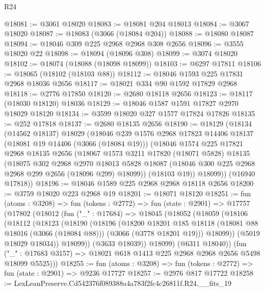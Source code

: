 \begin{lexlean}{R24}
\begin{coremodule}
@18081 := @3061 @18020
@18083 := @18081 @204 @18013
@18084 := @3067 @18020
@18087 := @18083 (@3066 (@18084 @204))
@18088 := @18080 @18087
@18094 := @18046 @309 @225 @2968 @2968 @308 @2656
@18096 := @3555 @18020 @22
@18098 := @18094 (@18096 @308)
@18099 := @3074 @18020
@18102 := @18074 (@18088 (@18098 @18099))
@18103 := @6297 @17811
@18106 := @18065 (@18102 (@18103 @88))
@18112 := @18046 @1593 @225 @17831 @2968 @18036 @2656
@18117 := @18021 @334 @90 @1592 @17829 @2968
@18118 := @2776 @17850
@18120 := @2680 @18118 @2656
@18123 := @18117 (@18030 @18120) @18036
@18129 := @18046 @1587 @1591 @17827 @2970 @18029 @18120
@18134 := @3599 @18020 @327 @1577 @17824 @17826
@18135 := @252 @17818
@18137 := @2680 @18135 @2656
@18190 := @18129
    (@18134
      (@14562 @18137)
      @18029
      (@18046
        @239
        @1576
        @2968
        @17823
        @14406
        @18137
        (@18081 @19 @14406 (@3066 (@18084 @19)))
        (@18046
          @1574
          @225
          @17821
          @2968
          @18135
          @2656
          (@18067
            @1573
            @3211
            @17820
            (@18071 @5828)
            @18135
            (@18075
              @302
              @2968
              @2970
              @18013
              @5828
              @18087
              (@18046 @300 @225 @2968 @2968 @299 @2656 (@18096 @299) @18099))
            (@18103 @19))
          @18099))
      (@16940 @17818))
@18196 := @18046 @1589 @225 @2968 @2968 @18118 @2656
@18200 := @3759 @18020 @223 @2968 @19
@18201 := @18071 @18120
@18251 := fun (atoms : @3208) =>
  fun (tokens : @2772) =>
  fun (state : @2901) =>
  @17757
    (@17802
      (@18012
        (fun ("_" : @17684) =>
        @18045
          (@18052
            (@18059
              (@18106
                (@18112
                  (@18123
                    (@18190
                      (@18196
                        (@18200
                          @18201
                          @185
                          @18118
                          (@18081 @88 @18016 (@3066 (@18084 @88)))
                          (@3066 (@3778 @18201 @19)))
                        @18099))
                    (@5019 @18029 @18034))
                  @18099))
              (@3633 @18039))
            @18099)
          (@6311 @18040))
        (fun ("_" : @17683 @3157) => @18021 @618 @1413 @225 @2968 @2968 @2656 @5498 @18099 @5525)))
@18255 := fun (atoms : @3208) => fun (tokens : @2772) => fun (state : @2901) => @9236 @17727
@18257 := @2976 @817 @17722
@18258 := LexLeanPreserve.Cd542376f089388a4a783f2fc4c26811f.R24.__fits_19

\end{coremodule}
\end{lexlean}
